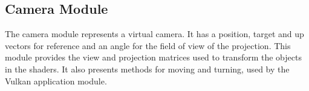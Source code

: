 \subsection{Camera Module}
The camera module represents a virtual camera. It has a position, target and up vectors for reference and an angle for the field of view of the projection. This module provides the view and projection matrices used to transform the objects in the shaders. It also presents methods for moving and turning, used by the Vulkan application module.
